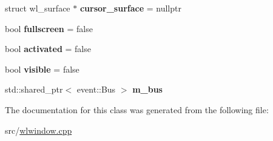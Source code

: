 \begin{DoxyCompactItemize}
struct wl\+\_\+surface $\ast$ {\bfseries cursor\+\_\+surface} = nullptr
\item 
\mbox{\label{classwlwin_1_1WlWindow_a9b07899979cfd189298923849f97d2d3}} 
bool {\bfseries fullscreen} = false
\item 
\mbox{\label{classwlwin_1_1WlWindow_abc96f847ea34ba956421406229274a7c}} 
bool {\bfseries activated} = false
\item 
\mbox{\label{classwlwin_1_1WlWindow_acafa3b508dad100241d3c83bf4872e94}} 
bool {\bfseries visible} = false
\item 
\mbox{\label{classwlwin_1_1WlWindow_afbad336543df25e100a2f61026f83210}} 
std\+::shared\+\_\+ptr$<$ event\+::\+Bus $>$ {\bfseries m\+\_\+bus}
\end{DoxyCompactItemize}


The documentation for this class was generated from the following file\+:\begin{DoxyCompactItemize}
\item 
src/\mbox{\hyperlink{wlwindow_8cpp}{wlwindow.\+cpp}}\end{DoxyCompactItemize}
